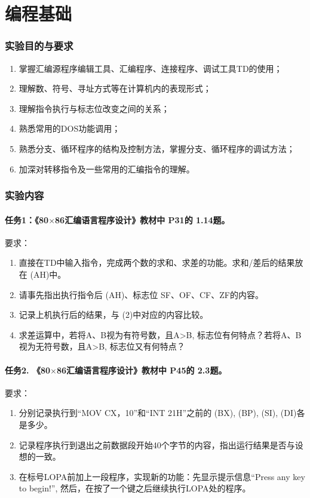 \documentclass{article}
\newcommand{\toc}{
	\newpage
	\pagenumbering{Roman}
	\setcounter{page}{1}
	\tableofcontents
}
\newcommand{\maincontents}{
	\newpage
	\pagestyle{fancy}
	\setlength{\headheight}{12.2pt}
	\setlength{\headsep}{15pt}
	\pagenumbering{arabic}
	\setcounter{page}{1}
}
\begin{document}
\toc

\maincontents


\part{编程基础}
	\section{实验目的与要求}
	\begin{enumerate}
		\item 掌握汇编源程序编辑工具、汇编程序、连接程序、调试工具TD的使用；
		\item 理解数、符号、寻址方式等在计算机内的表现形式；
		\item 理解指令执行与标志位改变之间的关系；
		\item 熟悉常用的DOS功能调用；
		\item 熟悉分支、循环程序的结构及控制方法，掌握分支、循环程序的调试方法；
		\item 加深对转移指令及一些常用的汇编指令的理解。
	\end{enumerate}

	\section{实验内容}

	\subsection[任务1]{任务1：《80$\times$86汇编语言程序设计》教材中 P31的 1.14题。}
	要求：
	\begin{enumerate}
		\item 直接在TD中输入指令，完成两个数的求和、求差的功能。求和/差后的结果放在 (AH)中。
		\item 请事先指出执行指令后 (AH)、标志位 SF、OF、CF、ZF的内容。
		\item 记录上机执行后的结果，与 (2)中对应的内容比较。
		\item 求差运算中，若将A、B视为有符号数，且A>B, 标志位有何特点？若将A、B视为无符号数，且A>B, 标志位又有何特点？
	\end{enumerate}

	\subsection[任务2]{任务2. 《80$\times$86汇编语言程序设计》教材中 P45的 2.3题。}
	要求：
	\begin{enumerate}
		\item 分别记录执行到“MOV  CX，10”和“INT 21H”之前的 (BX), (BP), (SI), (DI)各是多少。
		\item 记录程序执行到退出之前数据段开始40个字节的内容，指出运行结果是否与设想的一致。
		\item 在标号LOPA前加上一段程序，实现新的功能：先显示提示信息“Press any key to begin!”, 然后，在按了一个键之后继续执行LOPA处的程序。
	\end{enumerate}
\end{document}

